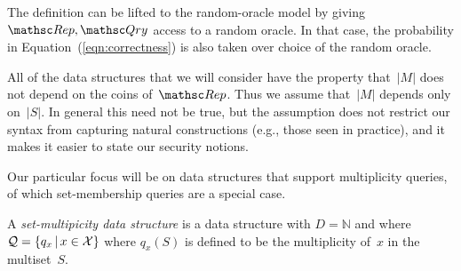 \noindent
The definition can be lifted to the random-oracle model
by giving $\Rep, \Qry$ access to a random oracle. In that case,
the probability in Equation~(\ref{eqn:correctness}) is also taken over choice of the random oracle.

All of the data structures that we will consider have the property that~$|M|$ does not depend on the coins of~$\Rep$. Thus we assume that~$|M|$ depends only on~$|S|$.  In general this need not be true, but the assumption does not restrict our syntax from capturing natural constructions (e.g., those seen in practice), and it makes it easier to state our security notions.

Our particular focus will be on data structures that support multiplicity queries, of which set-membership queries are a special case.  
\begin{definition} A \emph{set-multipicity data structure} is a data structure with $D=\mathbb{N}$ and where ${\cal Q}=\{q_x \,|\, x \in {\cal X}\}$ where $q_x(S)$ is defined to be the multiplicity of~$x$ in the multiset~$S$.
\end{definition}
%


